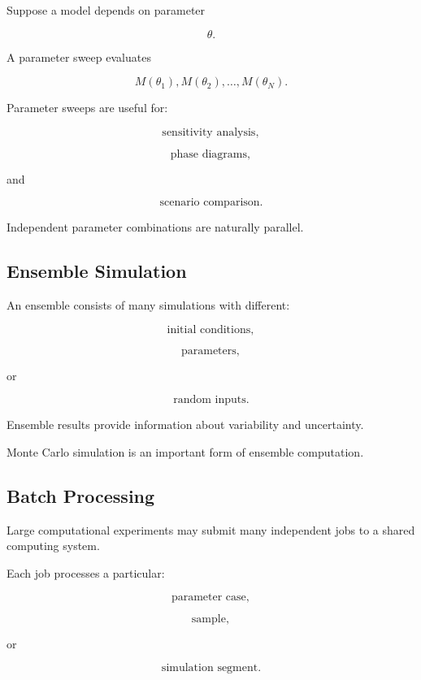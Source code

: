 Suppose a model depends on parameter

\[
\theta.
\]

A parameter sweep evaluates

\[
\boxed{
M(\theta_1),
M(\theta_2),
\ldots,
M(\theta_N).
}
\]

Parameter sweeps are useful for:

\[
\boxed{
\text{sensitivity analysis},
}
\]

\[
\boxed{
\text{phase diagrams},
}
\]

and

\[
\boxed{
\text{scenario comparison}.
}
\]

Independent parameter combinations are naturally parallel.

\subsection{Ensemble Simulation}
\label{subsec:ensemble-simulation}

An ensemble consists of many simulations with different:

\[
\boxed{
\text{initial conditions},
}
\]

\[
\boxed{
\text{parameters},
}
\]

or

\[
\boxed{
\text{random inputs}.
}
\]

Ensemble results provide information about variability and uncertainty.

Monte Carlo simulation is an important form of ensemble computation.

\subsection{Batch Processing}
\label{subsec:batch-processing}

Large computational experiments may submit many independent jobs to a
shared computing system.

Each job processes a particular:

\[
\boxed{
\text{parameter case},
}
\]

\[
\boxed{
\text{sample},
}
\]

or

\[
\boxed{
\text{simulation segment}.
}
\]

